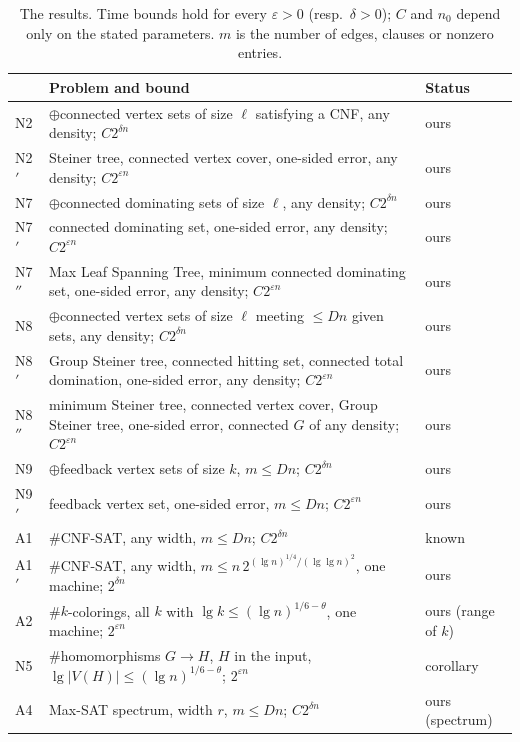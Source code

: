 \documentclass[11pt]{article}
\theoremstyle{remark}
\begin{document}
\begin{table}[t]
\caption{The results. Time bounds hold for every $\varepsilon>0$ (resp.\ $\delta>0$); $C$ and
$n_0$ depend only on the stated parameters. $m$ is the number of edges, clauses or nonzero
entries.}\label{tab:results}
\centering\small
\begin{tabularx}{\textwidth}{@{}lXl@{}}
\toprule
& Problem and bound & Status\\
\midrule
N2 & $\oplus$connected vertex sets of size $\ell$ satisfying a CNF, any density; $C2^{\delta n}$ & ours\\
N2$'$ & Steiner tree, connected vertex cover, one-sided error, any density; $C2^{\varepsilon n}$ & ours\\
N7 & $\oplus$connected dominating sets of size $\ell$, any density; $C2^{\delta n}$ & ours\\
N7$'$ & connected dominating set, one-sided error, any density; $C2^{\varepsilon n}$ & ours\\
N7$''$ & Max Leaf Spanning Tree, minimum connected dominating set, one-sided error, any density; $C2^{\varepsilon n}$ & ours\\
N8 & $\oplus$connected vertex sets of size $\ell$ meeting $\le Dn$ given sets, any density; $C2^{\delta n}$ & ours\\
N8$'$ & Group Steiner tree, connected hitting set, connected total domination, one-sided error, any density; $C2^{\varepsilon n}$ & ours\\
N8$''$ & minimum Steiner tree, connected vertex cover, Group Steiner tree, one-sided error, connected $G$ of any density; $C2^{\varepsilon n}$ & ours\\
N9 & $\oplus$feedback vertex sets of size $k$, $m\le Dn$; $C2^{\delta n}$ & ours\\
N9$'$ & feedback vertex set, one-sided error, $m\le Dn$; $C2^{\varepsilon n}$ & ours\\
A1 & \#CNF-SAT, any width, $m\le Dn$; $C2^{\delta n}$ & known~\cite{CIP06,anthropic}\\
A1$'$ & \#CNF-SAT, any width, $m\le n\,2^{(\lg n)^{1/4}/(\lg\lg n)^2}$, one machine; $2^{\delta n}$ & ours\\
A2 & \#$k$-colorings, all $k$ with $\lg k\le(\lg n)^{1/6-\theta}$, one machine; $2^{\varepsilon n}$ & ours (range of $k$)\\
N5 & \#homomorphisms $G\to H$, $H$ in the input, $\lg|V(H)|\le(\lg n)^{1/6-\theta}$; $2^{\varepsilon n}$ & corollary\\
A4 & Max-SAT spectrum, width $r$, $m\le Dn$; $C2^{\delta n}$ & ours (spectrum)\\

\end{tabularx}
\end{table}
\end{document}
